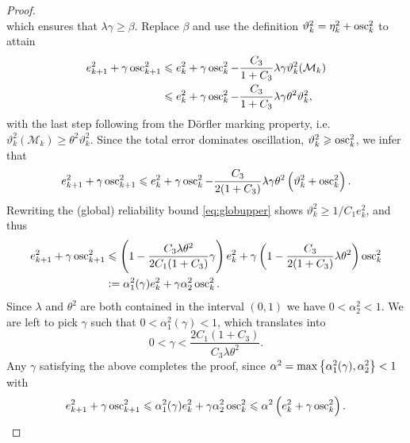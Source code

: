 \documentclass[thesis.tex]{subfiles}
\begin{document}
\begin{proof}
\[  \]
  which ensures that $\lambda \gamma \geq \beta$. Replace $\beta$ and use the definition $\vartheta_k^2 = \eta_k^2 + \operatorname{osc}_k^2$ to attain
  \begin{align*}
  e_{k+1}^2 + \gamma \operatorname{osc}^2_{k+1} &\leqslant e_k^2+\gamma \operatorname{osc}_k^2 - \frac{C_3}{1+C_3} \lambda \gamma \vartheta_k^2(\mathcal{M}_k) \\
    &\leqslant e_k^2 + \gamma \operatorname{osc}_k^2 - \frac{C_3}{1 + C_3} \lambda \gamma \theta^2 \vartheta_k^2,
  \end{align*}
  with the last step following from the D\"orfler marking property, i.e. $\vartheta_k^2(\mathcal{M}_k) \geq \theta^2 \vartheta_k^2$. 
  Since the total error dominates oscillation, $\vartheta_k^2 \geqslant \operatorname{osc}_k^2$, we infer that
  \[
    e_{k+1}^2 + \gamma \operatorname{osc}_{k+1}^2 \leqslant e_k^2 + \gamma \operatorname{osc}_k^2 - \frac{C_3}{2(1 + C_3)} \lambda \gamma \theta^2\left(\vartheta_k^2 + \operatorname{osc}_k^2\right).
  \]
  Rewriting the (global) reliability bound \ref{eq:globupper} shows $\vartheta_k^2 \geq 1/C_1 e_k^2$, and thus
  \begin{align*}
    e_{k+1}^2 + \gamma \operatorname{osc}_{k+1}^2 &\leqslant \left(1 - \frac{C_3 \lambda \theta^2}{2C_1(1+C_3)}\gamma\right) e_k^2 + \gamma \left( 1 - \frac{C_3}{2(1 + C_3)}\lambda\theta^2\right)\operatorname{osc}_k^2\\
    &:= \alpha^2_1(\gamma) e_k^2 + \gamma \alpha_2^2 \operatorname{osc}_k^2.
  \end{align*}
  Since $\lambda$ and $\theta^2$ are both contained in the interval $(0,1)$ we have $0 < \alpha^2_2 < 1$. We are left to
  pick $\gamma$ such that $0 < \alpha_1^2(\gamma) < 1$, which translates into
  \[
    0 < \gamma < \frac{2C_1(1 + C_3)}{C_3\lambda \theta^2}.
  \]
  Any $\gamma$ satisfying the above completes the proof, since $\alpha^2 = \max\set{\alpha_1^2(\gamma), \alpha_2^2} < 1$ with
  \[
    e_{k+1}^2 + \gamma \operatorname{osc}_{k+1}^2 \leqslant \alpha_1^2(\gamma)e_k^2 + \gamma \alpha_2^2\operatorname{osc}_k^2 \leqslant \alpha^2 \left( e_k^2 + \gamma \operatorname{osc}_k^2\right).
  \]


\end{proof}
\end{document}

